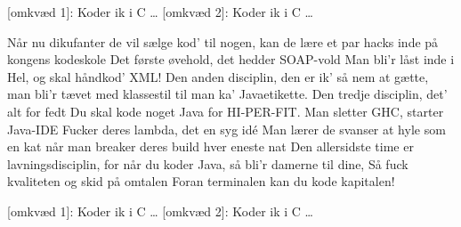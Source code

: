 \documentclass[a4paper,11pt]{article}
\begin{document}
\begin{song}
[omkvæd 1]: Koder ik i C \ldots
{}[omkvæd 2]: Koder ik i C \ldots

 Når nu dikufanter de vil sælge kod' til nogen,
kan de lære et par hacks inde på kongens kodeskole
Det første øvehold, det hedder SOAP-vold
Man bli'r låst inde i Hel, og skal håndkod' XML!
Den anden disciplin, den er ik' så nem at gætte,
man bli'r tævet med klassestil  til man ka' Javaetikette.
Den tredje disciplin, det' alt for fedt
Du skal kode noget Java for HI-PER-FIT.
Man sletter GHC, starter Java-IDE
Fucker deres lambda, det en syg idé
Man lærer de svanser at hyle som en kat
når man breaker deres build hver eneste nat
Den allersidste time er lavningsdisciplin,
for når du koder Java, så bli'r damerne til dine,
Så fuck kvaliteten og skid på omtalen
Foran terminalen kan du kode kapitalen!

[omkvæd 1]: Koder ik i C \ldots
{}[omkvæd 2]: Koder ik i C \ldots
\end{song}
\end{document}
